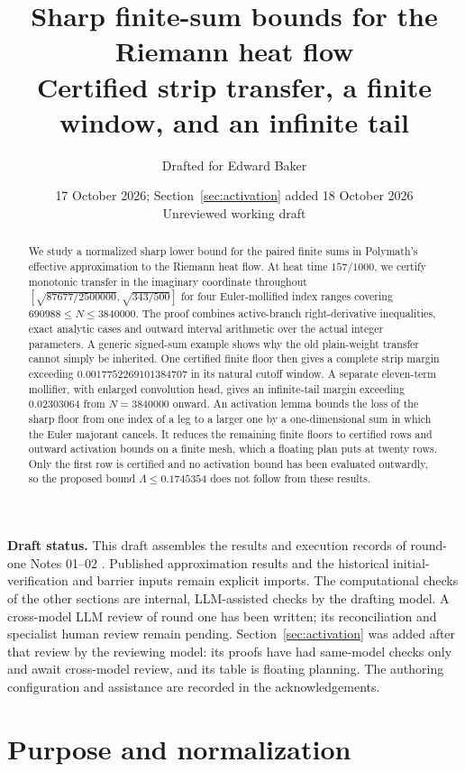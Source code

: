 \documentclass[11pt]{article}
\title{Sharp finite-sum bounds for the Riemann heat flow\\
\large Certified strip transfer, a finite window, and an infinite tail}
\author{Drafted for Edward Baker}
\date{17 October 2026; Section~\ref{sec:activation} added 18 October 2026\\
\small Unreviewed working draft}
\theoremstyle{remark}
\numberwithin{equation}{section}
\begin{document}
\maketitle
\begin{abstract}
We study a normalized sharp lower bound for the paired finite sums in
Polymath's effective approximation to the Riemann heat flow. At heat time
$157/1000$, we certify monotonic transfer in the imaginary coordinate
throughout $[\sqrt{87677/2500000},\sqrt{343/500}]$ for four Euler-mollified
index ranges covering $690988\le N\le3840000$. The proof combines
active-branch right-derivative inequalities, exact analytic cases and
outward interval arithmetic over the actual integer parameters. A generic
signed-sum example shows why the old plain-weight transfer cannot simply
be inherited. One certified finite floor then gives a complete strip
margin exceeding $0.0017752269101384707$ in its natural cutoff window.
A separate eleven-term mollifier, with enlarged convolution head, gives
an infinite-tail margin exceeding $0.02303064$ from $N=3840000$ onward.
An activation lemma bounds the loss of the sharp floor from one index of a
leg to a larger one by a one-dimensional sum in which the Euler majorant
cancels. It reduces the remaining finite floors to certified rows and
outward activation bounds on a finite mesh, which a floating plan puts at
twenty rows. Only the first row is certified and no activation bound has
been evaluated outwardly, so the proposed bound $\Lambda\le0.1745354$
does not follow from these results.
\end{abstract}

\noindent\textbf{Draft status.}
This draft assembles the results and execution records of round-one
Notes 01--02 \cite{note01,note02}. Published approximation results and the
historical initial-verification and barrier inputs remain explicit
imports. The computational checks of the other sections are internal,
LLM-assisted checks by the drafting model. A cross-model LLM review of
round one \cite{claudereview} has been written; its reconciliation and
specialist human review remain pending. Section~\ref{sec:activation} was
added after that review by the reviewing model: its proofs have had
same-model checks only and await cross-model review, and its table is
floating planning. The authoring
configuration and assistance are recorded in the acknowledgements.

\section{Purpose and normalization}\label{sec:setup}
\end{document}
